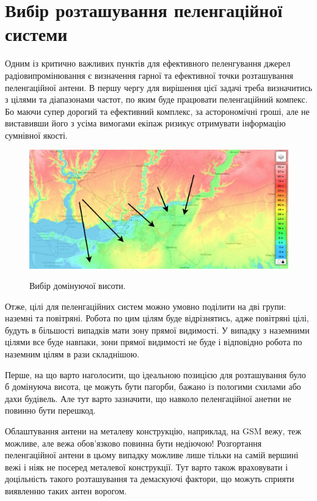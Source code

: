 \documentclass{article}
\begin{document}
\newpage
\section{Вибір розташування пеленгаційної системи}
\label{sec:DF Placement}

Одним із критично важливих пунктів для ефективного пеленгування джерел радіовипромінювання є визначення гарної та ефективної точки розташування пеленгаційної антени. В першу чергу для вирішення цієї задачі треба визначитись з цілями та діапазонами частот, по яким буде працювати пеленгаційний компекс. Бо маючи  супер дорогий та ефективний комплекс, за асторономічні гроші, але не виставивши його з усіма вимогами екіпаж ризикує отримувати інформацію сумнівної якості.

\begin{figure}[H]
	\centering
	{\includegraphics[width=0.8\linewidth]{images/dominant_height.png}}
	\caption{\label{fig:triangulations} Вибір домінуючої висоти.}
\end{figure}

Отже, цілі для пеленгаційних систем можно умовно поділити на дві групи: наземні та повітряні. Робота по цим цілям буде відрізнятись, адже повітряні цілі, будуть в більшості випадків мати зону прямої видимості. У випадку з наземними цілями все буде навпаки, зони прямої видимості не буде і відповідно робота по наземним цілям в рази складнішою.

Перше, на що варто наголосити, що ідеальною позицією для розташування було б домінуюча висота, це можуть бути пагорби, бажано із пологими схилами або дахи будівель. Але тут варто зазначити, що навколо пеленгаційної анетни не повинно бути перешкод. 

Облаштування антени на металеву конструкцію, наприклад, на GSM вежу, теж можливе, але вежа обов'язково повинна бути недіючою! Розгортання пеленгаційної антени в цьому випадку можливе лише тільки на самій вершині вежі і ніяк не посеред металевої конструкції. Тут варто також враховувати і доцільність такого розташування та демаскуючі фактори, що можуть сприяти виявленню таких антен ворогом.
\end{document}
